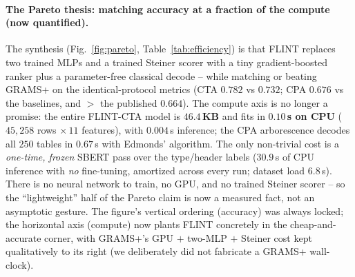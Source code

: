 \paragraph{The Pareto thesis: matching accuracy at a fraction of the compute (now quantified).}
The synthesis (Fig.~\ref{fig:pareto}, Table~\ref{tab:efficiency}) is that FLINT
replaces two trained MLPs and a trained Steiner scorer with a tiny gradient-boosted
ranker plus a parameter-free classical decode -- while matching or beating GRAMS+ on
the identical-protocol metrics (CTA $0.782$ vs $0.732$; CPA $0.676$ vs the baselines,
and $>$ the published $0.664$). The compute axis is no longer a promise: the entire
FLINT-CTA model is \textbf{$46.4$\,KB} and fits in \textbf{$0.10$\,s on CPU}
($45{,}258$ rows $\times\,11$ features), with $0.004$\,s inference; the CPA
arborescence decodes all $250$ tables in $0.67$\,s with Edmonds' algorithm. The only
non-trivial cost is a \emph{one-time, frozen} SBERT pass over the type/header labels
($30.9$\,s of CPU inference with \emph{no} fine-tuning, amortized across every run;
dataset load $6.8$\,s). There is no neural network to train, no GPU, and no trained
Steiner scorer -- so the ``lightweight'' half of the Pareto claim is now a measured
fact, not an asymptotic gesture. The figure's vertical ordering (accuracy) was always
locked; the horizontal axis (compute) now plants FLINT concretely in the
cheap-and-accurate corner, with GRAMS+'s GPU $+$ two-MLP $+$ Steiner cost kept
qualitatively to its right (we deliberately did not fabricate a GRAMS+ wall-clock).


